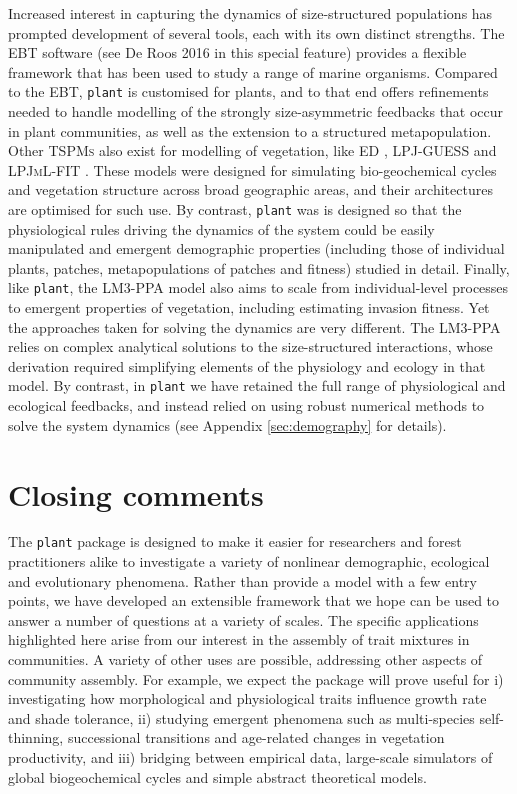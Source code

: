 \documentclass[a4paper,11pt]{article}
\newcommand{\plant}{\texttt{plant}}
\begin{document}
Increased interest in capturing the dynamics of size-structured populations
has prompted development of several tools, each with its own distinct
strengths. The \textsc{EBT} software (see De Roos 2016 in this special feature) provides
a flexible framework that has been used to study a range of marine organisms.
Compared to the \textsc{EBT}, {\plant} is customised for plants, and
to that end offers refinements needed to handle modelling of the strongly
size-asymmetric feedbacks that occur in plant communities, as well as the
extension to a structured metapopulation. Other \textsc{TSPMs} also exist for modelling of vegetation, like \textsc{ED}
\citep[ver 1 and 2;][]{Moorcroft-2001, Medvigy-2009}, \textsc {LPJ-GUESS}
\citep{Smith-2014} and \textsc{LPJmL-FIT} \citep{Sakschewski-2015}. These
models were designed for simulating bio-geochemical cycles and vegetation
structure across broad geographic areas, and their architectures are
optimised for such use. By contrast, {\plant} was is designed so that the
physiological rules driving the dynamics of the system could be easily
manipulated and emergent demographic properties (including those of individual plants, patches, metapopulations of patches and fitness) studied in
detail. Finally, like {\plant}, the \textsc{LM3-PPA} \cite{Weng-2015} model also aims
to scale from individual-level processes to emergent properties of
vegetation, including estimating invasion fitness. Yet the approaches taken
for solving the dynamics are very different. The \textsc{LM3-PPA} relies on
complex analytical solutions to the size-structured interactions, whose
derivation required simplifying elements of the physiology and ecology in that
model. By contrast, in {\plant} we have retained the full range of
physiological and ecological feedbacks, and instead relied on using robust
numerical methods to solve the system dynamics (see Appendix
\ref{sec:demography} for details).

\section{Closing comments}

The {\plant} package is designed to make it easier for researchers and forest
practitioners alike to investigate a variety of nonlinear demographic, ecological and evolutionary
phenomena. Rather than provide a model with a few entry points, we
have developed an extensible framework that we hope can be used to
answer a number of questions at a variety of scales. The specific
applications highlighted here arise from our interest in the assembly of
trait mixtures in communities. A variety of other uses are
possible, addressing other aspects of community assembly. For
example, we expect the package will prove useful for i) investigating
how morphological and physiological traits influence growth rate and
shade tolerance, ii) studying emergent phenomena such as multi-species self-thinning, successional transitions and age-related changes in
vegetation productivity, and iii) bridging between empirical data,
large-scale simulators of global biogeochemical cycles and simple
abstract theoretical models.
\end{document}
